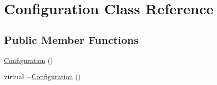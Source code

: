 \hypertarget{classConfiguration}{
\section{Configuration Class Reference}
\label{classConfiguration}
}
\subsection*{Public Member Functions}
\begin{DoxyCompactItemize}
\item 
\hyperlink{classConfiguration_a779947337bf652f0e773cb29f37f14ba}{Configuration} ()
\item 
virtual \hyperlink{classConfiguration_a0dd0fa189e239f4c9a036303f641441e}{$\sim$Configuration} ()
\end{DoxyCompactItemize}
